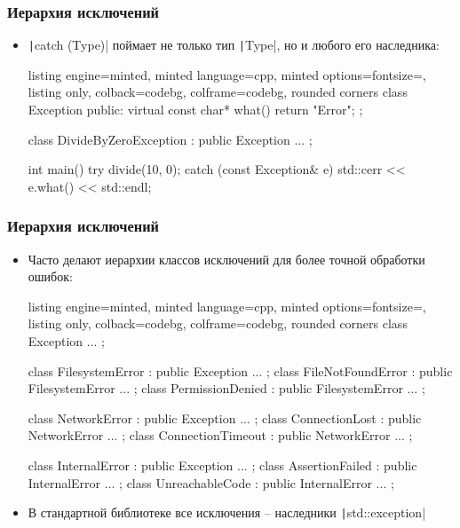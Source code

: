 \documentclass[10pt]{beamer}
\begin{document}
\begin{frame}[fragile]
\frametitle{Иерархия исключений}
\begin{itemize}
\item \texttt|catch (Type)| поймает не только тип \texttt|Type|, но и любого его наследника:
\begin{tcblisting}{listing engine=minted, minted language=cpp, minted options={fontsize=\scriptsize}, listing only, colback=codebg, colframe=codebg, rounded corners}
class Exception {
public:
  virtual const char* what() { return "Error"; }
};

class DivideByZeroException : public Exception { ... };

int main() {
  try {
    divide(10, 0);
  }
  catch (const Exception& e) {
    std::cerr << e.what() << std::endl;
  }
}
\end{tcblisting}
\end{itemize}
\end{frame}

\begin{frame}[fragile]
\frametitle{Иерархия исключений}
\begin{itemize}
\item Часто делают иерархии классов исключений для более точной обработки ошибок:
\begin{tcblisting}{listing engine=minted, minted language=cpp, minted options={fontsize=\scriptsize}, listing only, colback=codebg, colframe=codebg, rounded corners}
class Exception { ... };

class FilesystemError   : public Exception { ... };
class FileNotFoundError : public FilesystemError { ... };
class PermissionDenied  : public FilesystemError { ... };

class NetworkError      : public Exception { ... };
class ConnectionLost    : public NetworkError { ... };
class ConnectionTimeout : public NetworkError { ... };

class InternalError     : public Exception { ... };
class AssertionFailed   : public InternalError { ... };
class UnreachableCode   : public InternalError { ... };
\end{tcblisting}
\pause
{}
\item В стандартной библиотеке все исключения -- наследники \texttt|std::exception|
\end{itemize}
\end{frame}
\end{document}
